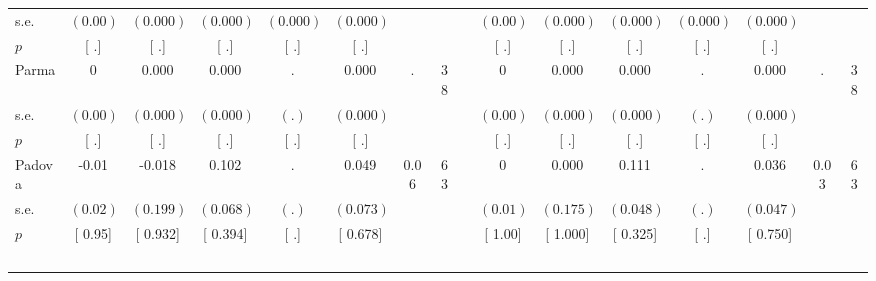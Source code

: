 \begin{longtable}{L{8em} c c c c c c c p{1em} c c c c c c c}
\quad \quad \quad \quad s.e.& $ (     0.00)$ & $ (    0.000)$ & $ (    0.000)$ & $ (    0.000)$ & $ (    0.000)$ & & & & $ (     0.00)$ & $ (    0.000)$ & $ (    0.000)$ & $ (    0.000)$ & $ (    0.000)$ & &  \\*
\quad \quad \quad \quad $ p$ & [        .] & [        .] & [        .] & [        .] & [        .] & & & & [        .] & [        .] & [        .] & [        .] & [        .] & &  \\[1em]
\quad \quad \quad Parma& 0 &     0.000 &     0.000 &         . &     0.000 &         . &        38 & & 0 &     0.000 &     0.000 &         . &     0.000 &         . &        38  \\*
\quad \quad \quad \quad s.e.& $ (     0.00)$ & $ (    0.000)$ & $ (    0.000)$ & $ (        .)$ & $ (    0.000)$ & & & & $ (     0.00)$ & $ (    0.000)$ & $ (    0.000)$ & $ (        .)$ & $ (    0.000)$ & &  \\*
\quad \quad \quad \quad $ p$ & [        .] & [        .] & [        .] & [        .] & [        .] & & & & [        .] & [        .] & [        .] & [        .] & [        .] & &  \\[1em]
\quad \quad \quad Padova& -0.01 &    -0.018 &     0.102 &         . &     0.049 &      0.06 &        63 & & 0 &     0.000 &     0.111 &         . &     0.036 &      0.03 &        63  \\*
\quad \quad \quad \quad s.e.& $ (     0.02)$ & $ (    0.199)$ & $ (    0.068)$ & $ (        .)$ & $ (    0.073)$ & & & & $ (     0.01)$ & $ (    0.175)$ & $ (    0.048)$ & $ (        .)$ & $ (    0.047)$ & &  \\*
\quad \quad \quad \quad $ p$ & [     0.95] & [    0.932] & [    0.394] & [        .] & [    0.678] & & & & [     1.00] & [    1.000] & [    0.325] & [        .] & [    0.750] & &  \\[1em]
~\\[1em]
\end{longtable}